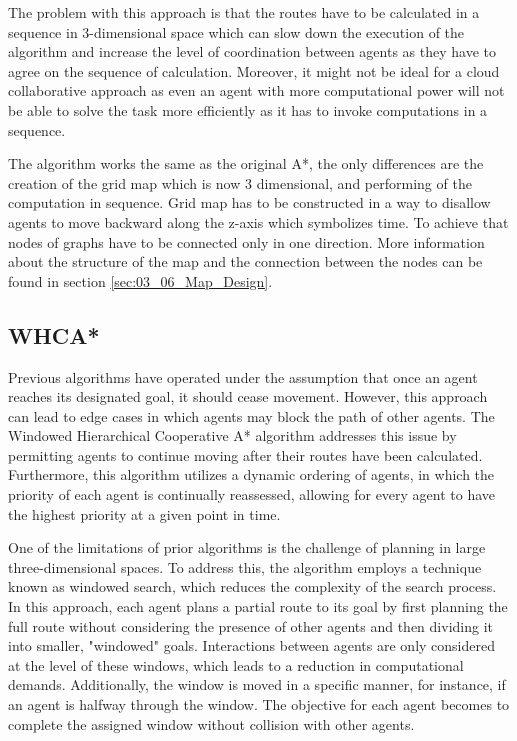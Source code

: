 The problem with this approach is that the routes have to be calculated in a sequence in 3-dimensional space which can slow down the execution of the algorithm and increase the level of coordination between agents as they have to agree on the sequence of calculation. Moreover, it might not be ideal for a cloud collaborative approach as even an agent with more computational power will not be able to solve the task more efficiently as it has to invoke computations in a sequence.

The algorithm works the same as the original A*, the only differences are the creation of the grid map which is now 3 dimensional, and  performing of the computation in sequence. Grid map has to be constructed in a way to disallow agents to move backward along the z-axis which symbolizes time. To achieve that nodes of graphs have to be connected only in one direction. More information about the structure of the map and the connection between the nodes can be found in section \ref{sec:03_06_Map_Design}.

\subsection{WHCA*}
Previous algorithms have operated under the assumption that once an agent reaches its designated goal, it should cease movement. However, this approach can lead to edge cases in which agents may block the path of other agents. The Windowed Hierarchical Cooperative A* algorithm addresses this issue by permitting agents to continue moving after their routes have been calculated. Furthermore, this algorithm utilizes a dynamic ordering of agents, in which the priority of each agent is continually reassessed, allowing for every agent to have the highest priority at a given point in time.

One of the limitations of prior algorithms is the challenge of planning in large three-dimensional spaces. To address this, the algorithm employs a technique known as windowed search, which reduces the complexity of the search process. In this approach, each agent plans a partial route to its goal by first planning the full route without considering the presence of other agents and then dividing it into smaller, "windowed" goals. Interactions between agents are only considered at the level of these windows, which leads to a reduction in computational demands. Additionally, the window is moved in a specific manner, for instance, if an agent is halfway through the window. The objective for each agent becomes to complete the assigned window without collision with other agents\cite{whca}\cite{path_adv}.

